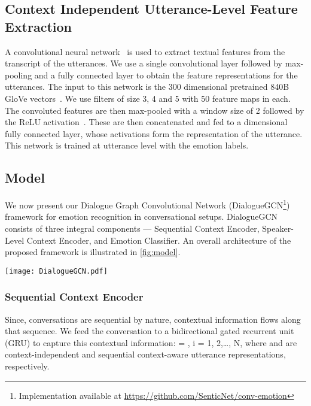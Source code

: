 \documentclass[11pt,a4paper]{article}
\begin{document}
\subsection{Context Independent Utterance-Level Feature Extraction}
\label{sec:text-feat-extr}
A convolutional neural network~\cite{kim2014convolutional} is used to extract textual features from the transcript of the utterances. 
We use a single convolutional layer followed by max-pooling and a fully connected layer to obtain 
the feature representations for the utterances. The input to this network is the 300 dimensional pretrained 840B GloVe vectors~\cite{pennington2014glove}. We use filters of size 3, 4 and 5 with 50 feature maps in each. The convoluted features are then max-pooled with a window size of 2 followed by the ReLU activation~\cite{nair2010rectified}.
These are then concatenated and fed to a  dimensional fully connected layer, whose activations form the representation of the utterance. 
This network is trained at utterance level with the emotion labels.









\subsection{Model}
We now present our Dialogue Graph Convolutional Network (DialogueGCN\footnote{Implementation available at \url{https://github.com/SenticNet/conv-emotion}}) framework for emotion recognition in conversational setups. DialogueGCN consists of three integral components --- Sequential Context Encoder, Speaker-Level Context Encoder, and Emotion Classifier. An overall architecture of the proposed framework is illustrated in \cref{fig:model}.  

\begin{figure*}[t]
    \centering
    \texttt{[image: DialogueGCN.pdf]}
    \caption{Overview of DialogueGCN, congruent to the illustration in \cref{example}.}
    \label{fig:model}
\end{figure*}

\subsubsection{Sequential Context Encoder} 
Since, conversations are sequential by nature, contextual information flows along that sequence. We feed the conversation to a bidirectional gated recurrent unit (GRU) to capture this contextual information:
  = , i = 1, 2,\dots, N, where  and  are context-independent and sequential context-aware utterance representations, respectively.
\end{document}
